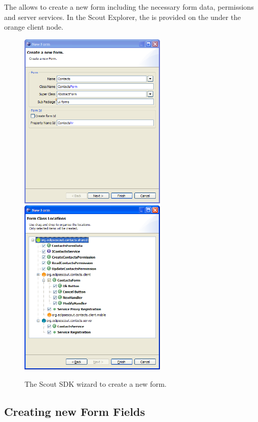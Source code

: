 \documentclass[a4paper,10pt,twoside]{book}
\begin{document}
The  allows to create a new form including the necessary form data, permissions and server services. 
In the Scout Explorer, the  is provided on the  under the orange client node. 

\begin{figure}
\includegraphics[width=7cm]{wizard_form_1.png} \hspace{5mm}
\includegraphics[width=7cm]{wizard_form_2.png}
\caption{The Scout SDK wizard to create a new form.}
\end{figure}


\subsection{Creating new Form Fields}
\end{document}
